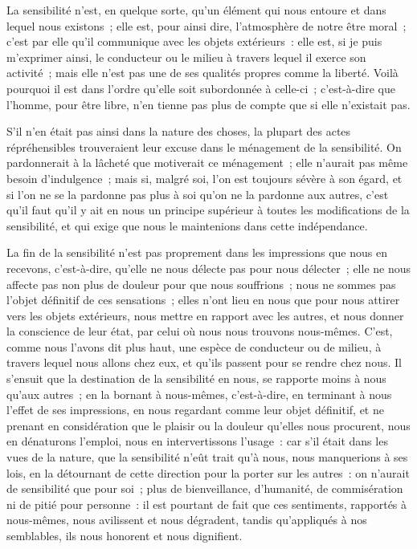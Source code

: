 \documentclass[french,twoside]{book} %
\begin{document}
La sensibilité n’est, en quelque sorte, qu’un élément qui nous entoure et dans lequel nous existons ; elle est, pour ainsi dire, l’atmosphère de notre être moral ; c’est par elle qu’il communique avec les objets extérieurs : elle est, si je puis m’exprimer ainsi, le conducteur ou le milieu à travers lequel il exerce son activité ; mais elle n’est pas une de ses qualités propres comme la liberté. Voilà pourquoi il est dans l’ordre qu’elle soit subordonnée à celle-ci ; c’est-à-dire que l’homme, pour être libre, n’en tienne pas plus de compte que si elle n’existait pas.\par
S’il n’en était pas ainsi dans la nature des choses, la plupart des actes répréhensibles trouveraient leur excuse dans le ménagement de la sensibilité. On pardonnerait à la lâcheté que motiverait ce ménagement ; elle n’aurait pas même besoin d’indulgence ; mais si, malgré soi, l’on est toujours sévère à son égard, et si l’on ne se la pardonne pas plus à soi qu’on ne la pardonne aux autres, c’est qu’il faut qu’il y ait en nous un principe supérieur à toutes les modifications de la sensibilité, et qui exige que nous le maintenions dans cette indépendance.\par
La fin de la sensibilité n’est pas proprement dans les impressions que nous en recevons, c’est-à-dire, qu’elle ne nous délecte pas pour nous délecter ; elle ne nous affecte pas non plus de douleur pour que nous souffrions ; nous ne sommes pas l’objet définitif de ces sensations ; elles n’ont lieu en nous que pour nous attirer vers les objets extérieurs, nous mettre en rapport avec les autres, et nous donner la conscience de leur état, par celui où nous nous trouvons nous-mêmes. C’est, comme nous l’avons dit plus haut, une espèce de conducteur ou de milieu, à travers lequel nous allons chez eux, et qu’ils passent pour se rendre chez nous. Il s’ensuit que la destination de la sensibilité en nous, se rapporte moins à nous qu’aux autres ; en la bornant à nous-mêmes, c’est-à-dire, en terminant à nous l’effet de ses impressions, en nous regardant comme leur objet définitif, et ne prenant en considération que le plaisir ou la douleur qu’elles nous procurent, nous en dénaturons l’emploi, nous en intervertissons l’usage : car s’il était dans les vues de la nature, que la sensibilité n’eût trait qu’à nous, nous manquerions à ses lois, en la détournant de cette direction pour la porter sur les autres : on n’aurait de sensibilité que pour soi ; plus de bienveillance, d’humanité, de commisération ni de pitié pour personne : il est pourtant de fait que ces sentiments, rapportés à nous-mêmes, nous avilissent et nous dégradent, tandis qu’appliqués à nos semblables, ils nous honorent et nous dignifient.\par
\end{document}
